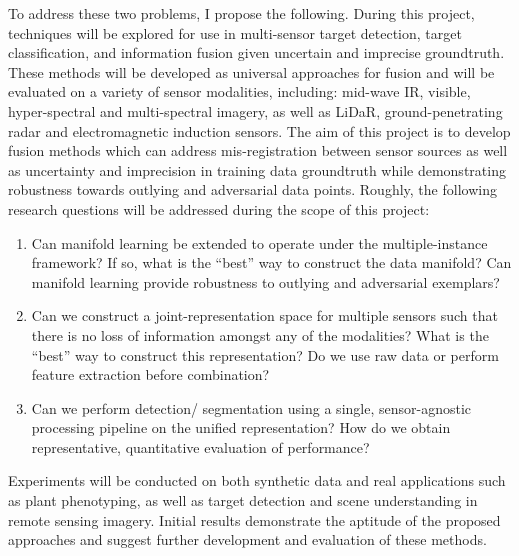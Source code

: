 To address these two problems, I propose the following.  During this project, techniques will be explored for use in multi-sensor target detection, target classification, and information fusion given uncertain and imprecise groundtruth.  These methods will be developed as universal approaches for fusion and will be evaluated on a variety of sensor modalities, including: mid-wave IR, visible, hyper-spectral and multi-spectral imagery, as well as LiDaR, ground-penetrating radar and electromagnetic induction sensors.  The aim of this project is to develop fusion methods which can address mis-registration between sensor sources as well as uncertainty and imprecision in training data groundtruth while demonstrating robustness towards outlying and adversarial data points. Roughly, the following research questions will be addressed during the scope of this project:
\begin{enumerate}
	\item Can manifold learning be extended to operate under the multiple-instance framework? If so, what is the ``best'' way to construct the data manifold?  Can manifold learning provide robustness to outlying and adversarial exemplars?
	\item Can we construct a joint-representation space for multiple sensors such that there is no loss of information amongst any of the modalities?  What is the ``best'' way to construct this representation?  Do we use raw data or perform feature extraction before combination?
	\item Can we perform detection/ segmentation using a single, sensor-agnostic processing pipeline on the unified representation?  How do we obtain representative, quantitative evaluation of performance?
\end{enumerate} 

Experiments will be conducted on both synthetic data and real applications such as plant phenotyping, as well as target detection and scene understanding in remote sensing imagery. Initial results demonstrate the aptitude of the proposed approaches and suggest further development and evaluation of these methods.


